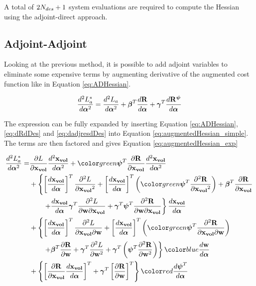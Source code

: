 \documentclass[letterpaper,12pt,]{article}
\begin{document}
A total of $2N_{des}+1$ system evaluations are required to compute the Hessian using the adjoint-direct approach.

\newpage
\subsection*{Adjoint-Adjoint}
Looking at the previous method, it is possible to add adjoint variables to eliminate some expensive terms by augmenting derivative of the augmented cost function like in Equation \ref{eq:ADHessian}.

\begin{equation}
	\dfrac{d^2L_a^*}{d\boldsymbol{\alpha}^2} = 
	\dfrac{d^2L_a}{d\boldsymbol{\alpha}^2}
	+
	\boldsymbol{\beta}^T
	\dfrac{d\mathbf{R}}{d\boldsymbol{\alpha}}
	+
	\boldsymbol{\gamma}^T
	\dfrac{d\mathbf{R}^{\boldsymbol{\psi}}}{d\boldsymbol{\alpha}}
\label{eq:augmentedHessian_simple}
\end{equation}

The expression can be fully expanded by inserting Equation \ref{eq:ADHessian}, \ref{eq:dRdDes} and \ref{eq:dadjresdDes} into Equation \ref{eq:augmentedHessian_simple}.
The terms are then factored and gives Equation \ref{eq:augmentedHessian_exp}

\begin{equation}
\begin{split}
	\DDt{L_a^*}{\balfa} = 
	&
	\del{L}{\xvol}
	\DDt{\xvol}{\balfa}
	+
	\green{\bpsi}^T
	\del{\bR}{\xvol}
	\DDt{\xvol}{\balfa}
	\\&
	+
	\left\{
		\trans{\Dt{\xvol}{\balfa}}
		\ddel{L}{\xvol}
		+
		\trans{\Dt{\xvol}{\balfa}}
		\left(
		\green{\bpsi}^T
		\ddel{\bR}{\xvol}
		\right)
		+
		\bbeta^T
			\del{\bR}{\xvol}
		\right.\\&\left. \quad\quad
		+
		\Dt{\xvol}{\balfa}
		\bgam^T
		\ddelm{L}{\bw}{\xvol}
		+
		\bgam^T
		\bpsi^T
		\ddelm{\bR}{\bw}{\xvol}
	\right\}
	\Dt{\xvol}{\balfa}
	\\&+
	\left\{
		\trans{\Dt{\xvol}{\balfa}}
		\ddelm{L}{\xvol}{\bw}
		+
		\trans{\Dt{\xvol}{\balfa}}
		\left(
		\green{\bpsi}^T
		\ddelm{\bR}{\xvol}{\bw}
		\right)
	\right.\\&\left. \quad\quad
		+
		\bbeta^T
		\del{\bR}{\bw}
		+
		\bgam^T
		\ddel{L}{\bw}
		+
		\bgam^T
		\left(
		\bpsi^T
		\ddel{\bR}{\bw}
		\right)
	\right\}
	\blue{\Dt{\bw}{\balfa}}
	\\&
	+
	\left\{
		\trans{
		\del{\bR}{\xvol}
		\Dt{\xvol}{\balfa}
		}
		+
		\bgam^T
		\trans{\del{\bR}{\bw}}
	\right\}
	\red{\Dt{\bpsi^T}{\balfa}}
\label{eq:augmentedHessian_exp}
\end{split}
\end{equation}
\end{document}
